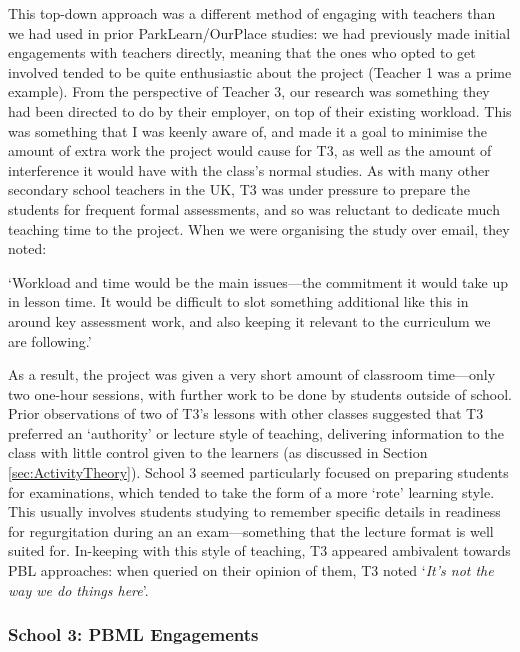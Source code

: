 This top-down approach was a different method of engaging with teachers than we had used in prior ParkLearn/OurPlace studies: we had previously made initial engagements with teachers directly, meaning that the ones who opted to get involved tended to be quite enthusiastic about the project (Teacher 1 was a prime example). From the perspective of Teacher 3, our research was something they had been directed to do by their employer, on top of their existing workload. This was something that I was keenly aware of, and made it a goal to minimise the amount of extra work the project would cause for T3, as well as the amount of interference it would have with the class's normal studies. As with many other secondary school teachers in the UK, T3 was under pressure to prepare the students for frequent formal assessments, and so was reluctant to dedicate much teaching time to the project. When we were organising the study over email, they noted:

\begin{displayquote}
`Workload and time would be the main issues---the commitment it would take up in lesson time. It would be difficult to slot something additional like this in around key assessment work, and also keeping it relevant to the curriculum we are following.'
\end{displayquote}

As a result, the project was given a very short amount of classroom time---only two one-hour sessions, with further work to be done by students outside of school. Prior observations of two of T3's lessons with other classes suggested that T3 preferred an `authority' or lecture style of teaching, delivering information to the class with little control given to the learners (as discussed in Section \ref{sec:ActivityTheory}). School 3 seemed particularly focused on preparing students for examinations, which tended to take the form of a more `rote' learning style. This usually involves students studying to remember specific details in readiness for regurgitation during an an exam---something that the lecture format is well suited for. In-keeping with this style of teaching, T3 appeared ambivalent towards PBL approaches: when queried on their opinion of them, T3 noted `\textit{It's not the way we do things here}'.

\subsubsection{School 3: PBML Engagements}

